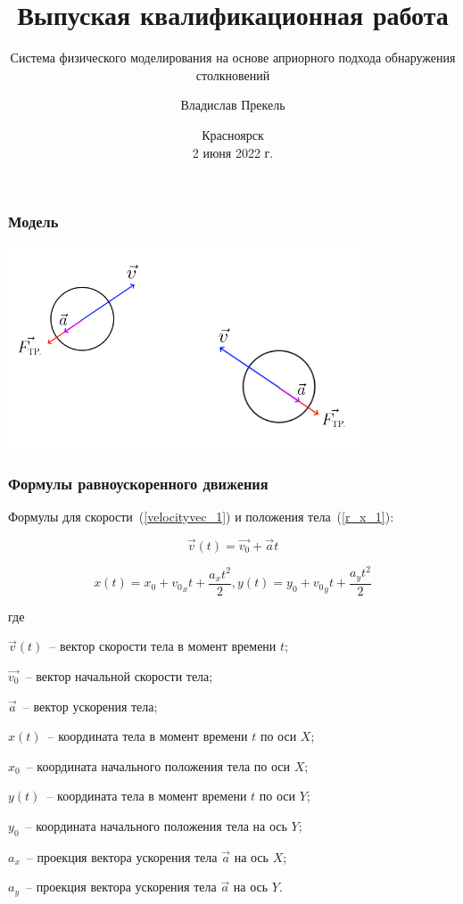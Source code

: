 \documentclass[xetex,aspectratio=43]{beamer}
\title{Выпуская квалификационная работа}
\subtitle{Система физического моделирования на основе априорного подхода обнаружения столкновений}
\author{Владислав Прекель}
\institute{ИКИТ СФУ\\КИ18-16б}
\date{Красноярск\\2 июня 2022 г.}
\newenvironment{Underequation}{
    \small
    \noindent
    где
    \hspace{-1.45ex}
    \setlength{\parindent}{3.5ex}
}{}
\begin{document}
\begin{frame}
    \titlepage
\end{frame}

\begin{frame}
    \frametitle{Модель}

    \includegraphics[height=6cm]{body_init}

\end{frame}

\begin{frame}
    \frametitle{Формулы равноускоренного движения}
    Формулы для скорости~(\ref{velocityvec_1}) и положения тела~(\ref{r_x_1}):

    \begin{equation}\label{velocityvec_1}
        \vec{v}(t) = \vec{v_0} + \vec{a}t
    \end{equation}

    \begin{equation}\label{r_x_1}
        x(t) = x_0 + {v_0}_x t + \frac{a_x t^2}{2},
        y(t) = y_0 + {v_0}_y t + \frac{a_y t^2}{2}
    \end{equation}


    \begin{Underequation}
        \(\vec{v}(t)\)~-- вектор скорости тела в момент времени \(t\);

        \(\vec{v_0}\)~-- вектор начальной скорости тела;

        \(\vec{a}\)~-- вектор ускорения тела;

        \(x(t)\)~-- координата тела в момент времени \(t\) по оси \(X\);

        \(x_0\)~-- координата начального положения тела по оси \(X\);

        \(y(t)\)~-- координата тела в момент времени \(t\) по оси \(Y\);

        \(y_0\)~-- координата начального положения тела на ось \(Y\);

        \(a_x\)~-- проекция вектора ускорения тела \(\vec{a}\) на ось \(X\);

        \(a_y\)~-- проекция вектора ускорения тела \(\vec{a}\) на ось \(Y\).
    \end{Underequation}
\end{frame}
\end{document}
